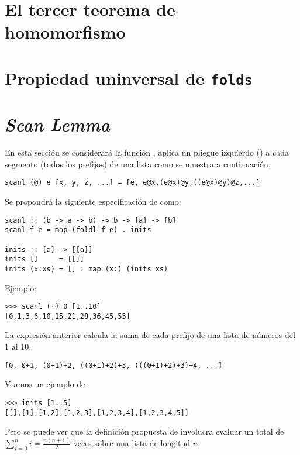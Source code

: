 
\section{El tercer teorema de homomorfismo}
\cite{Gibbons96:Third}

\section{Propiedad uninversal de \texttt{folds}}
\cite{univ_expre_fold}

\section{\textit{Scan Lemma}}\label{fundamentos:scan_lemma}
En esta sección se considerará la función ,  aplica un pliegue
izquierdo () a cada segmento (todos los prefijos) de una lista como se muestra
a continuación,

\begin{verbatim}
scanl (@) e [x, y, z, ...] = [e, e@x,(e@x)@y,((e@x)@y)@z,...]
\end{verbatim}

Se propondrá la siguiente especificación de  como:
\begin{verbatim}
scanl :: (b -> a -> b) -> b -> [a] -> [b]
scanl f e = map (foldl f e) . inits

inits :: [a] -> [[a]]
inits []     = [[]]
inits (x:xs) = [] : map (x:) (inits xs)
\end{verbatim}

Ejemplo:
\begin{verbatim}
>>> scanl (+) 0 [1..10]
[0,1,3,6,10,15,21,28,36,45,55]
\end{verbatim}

La expresión anterior calcula la suma de cada prefijo de una lista de números del 1 al 10.
\begin{verbatim}
[0, 0+1, (0+1)+2, ((0+1)+2)+3, (((0+1)+2)+3)+4, ...]
\end{verbatim}

Veamos un ejemplo de 
\begin{verbatim}
>>> inits [1..5]
[[],[1],[1,2],[1,2,3],[1,2,3,4],[1,2,3,4,5]]
\end{verbatim}

Pero se puede ver que la definición propuesta de  involucra evaluar  un
total de $\sum_{i=0}^{n} i = \frac{n(n+1)}{2}$ veces sobre una lista de longitud $n$.

